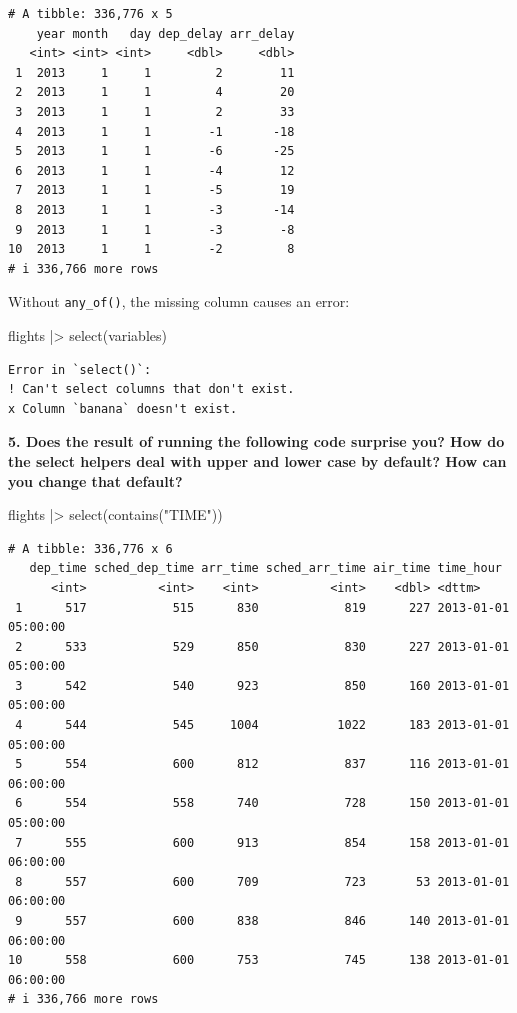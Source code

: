 \documentclass[
  letterpaper,
  DIV=11,
  numbers=noendperiod]{scrreprt}
\newenvironment{Shaded}{\begin{snugshade}}{\end{snugshade}}
\newcommand{\FunctionTok}[1]{\textcolor[rgb]{0.28,0.35,0.67}{#1}}
\newcommand{\NormalTok}[1]{\textcolor[rgb]{0.00,0.23,0.31}{#1}}
\newcommand{\SpecialCharTok}[1]{\textcolor[rgb]{0.37,0.37,0.37}{#1}}
\newcommand{\StringTok}[1]{\textcolor[rgb]{0.13,0.47,0.30}{#1}}
\begin{document}
\begin{verbatim}
# A tibble: 336,776 x 5
    year month   day dep_delay arr_delay
   <int> <int> <int>     <dbl>     <dbl>
 1  2013     1     1         2        11
 2  2013     1     1         4        20
 3  2013     1     1         2        33
 4  2013     1     1        -1       -18
 5  2013     1     1        -6       -25
 6  2013     1     1        -4        12
 7  2013     1     1        -5        19
 8  2013     1     1        -3       -14
 9  2013     1     1        -3        -8
10  2013     1     1        -2         8
# i 336,766 more rows
\end{verbatim}

Without \texttt{any\_of()}, the missing column causes an error:

\begin{Shaded}
\begin{Highlighting}[]
\NormalTok{flights }\SpecialCharTok{|\textgreater{}}
  \FunctionTok{select}\NormalTok{(variables)}
\end{Highlighting}
\end{Shaded}

\begin{verbatim}
Error in `select()`:
! Can't select columns that don't exist.
x Column `banana` doesn't exist.
\end{verbatim}

\textbf{5. Does the result of running the following code surprise you?
How do the select helpers deal with upper and lower case by default? How
can you change that default?}

\begin{Shaded}
\begin{Highlighting}[]
\NormalTok{flights }\SpecialCharTok{|\textgreater{}}
  \FunctionTok{select}\NormalTok{(}\FunctionTok{contains}\NormalTok{(}\StringTok{"TIME"}\NormalTok{))}
\end{Highlighting}
\end{Shaded}

\begin{verbatim}
# A tibble: 336,776 x 6
   dep_time sched_dep_time arr_time sched_arr_time air_time time_hour          
      <int>          <int>    <int>          <int>    <dbl> <dttm>             
 1      517            515      830            819      227 2013-01-01 05:00:00
 2      533            529      850            830      227 2013-01-01 05:00:00
 3      542            540      923            850      160 2013-01-01 05:00:00
 4      544            545     1004           1022      183 2013-01-01 05:00:00
 5      554            600      812            837      116 2013-01-01 06:00:00
 6      554            558      740            728      150 2013-01-01 05:00:00
 7      555            600      913            854      158 2013-01-01 06:00:00
 8      557            600      709            723       53 2013-01-01 06:00:00
 9      557            600      838            846      140 2013-01-01 06:00:00
10      558            600      753            745      138 2013-01-01 06:00:00
# i 336,766 more rows
\end{verbatim}
\end{document}
